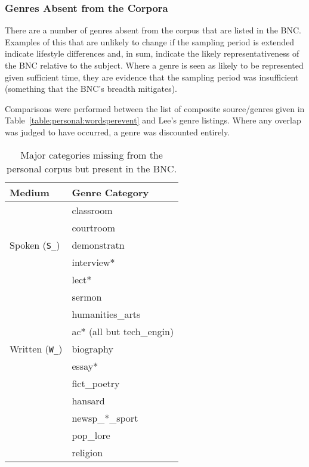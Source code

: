 \subsubsection{Genres Absent from the Corpora}
There are a number of genres absent from the corpus that are listed in the BNC\@.  Examples of this that are unlikely to change if the sampling period is extended indicate lifestyle differences and, in sum, indicate the likely representativeness of the BNC relative to the subject.  Where a genre is seen as likely to be represented given sufficient time, they are evidence that the sampling period was insufficient (something that the BNC's breadth mitigates).

Comparisons were performed between the list of composite source/genres given in Table~\ref{table:personal:wordsperevent} and Lee's genre listings.  Where any overlap was judged to have occurred, a genre was discounted entirely.


\begin{table}[ht]
    \centering

    \begin{tabular}{|l|l|}
        \hline
        Medium & Genre Category \\ \hline
        \multirow{5}{*}{Spoken (\texttt{S\_})} 
                                & classroom \\
                                & courtroom \\
                                & demonstratn \\
                                & interview* \\
                                & lect* \\
                                & sermon \\
        \hline
        \multirow{5}{*}{Written (\texttt{W\_})} 
                                & humanities\_arts \\
                                & ac* (all but tech\_engin) \\
                                & biography \\
                                & essay* \\
                                & fict\_poetry \\
                                & hansard \\
                                & newsp\_*\_sport \\
                                & pop\_lore \\
                                & religion \\
        \hline
    \end{tabular}
    \caption{Major categories missing from the personal corpus but present in the BNC.}
    \label{table:personal:missingcatspersonal}
\end{table}



